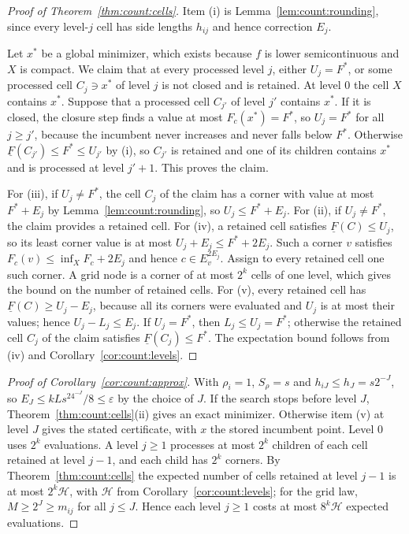 \begin{proof}[Proof of Theorem~\ref{thm:count:cells}]
Item (i) is Lemma~\ref{lem:count:rounding}, since every level-$j$ cell has
side lengths $h_{ij}$ and hence correction $E_j$.

Let $x^*$ be a global minimizer, which exists because $f$ is lower
semicontinuous and $X$ is compact. We claim that at every processed level
$j$, either $U_j=F^*$, or some processed cell $C_j\ni x^*$ of level $j$ is
not closed and is retained. At level $0$ the cell $X$ contains $x^*$. Suppose
that a processed cell $C_{j'}$ of level $j'$ contains $x^*$. If it is
closed, the closure step finds a value at most $F_c(x^*)=F^*$, so
$U_{j}=F^*$ for all $j\ge j'$, because the incumbent never increases and
never falls below $F^*$. Otherwise $\underline F(C_{j'})\le F^*\le U_{j'}$ by
(i), so $C_{j'}$ is retained and one of its children contains $x^*$ and is
processed at level $j'+1$. This proves the claim.

For (iii), if $U_j\ne F^*$, the cell $C_j$ of the claim has a corner with
value at most $F^*+E_j$ by Lemma~\ref{lem:count:rounding}, so
$U_j\le F^*+E_j$. For (ii), if $U_j\ne F^*$, the claim provides a retained
cell. For (iv), a retained cell satisfies $\underline F(C)\le U_j$, so its
least corner value is at most $U_j+E_j\le F^*+2E_j$. Such a corner $v$
satisfies $F_c(v)\le\inf_XF_c+2E_j$ and hence $c\in E_v^{2E_j}$. Assign to
every retained cell one such corner. A grid node is a corner of at most
$2^k$ cells of one level, which gives the bound on the number of retained
cells. For (v), every retained cell has $\underline F(C)\ge U_j-E_j$, because
all its corners were evaluated and $U_j$ is at most their values; hence
$U_j-L_j\le E_j$. If $U_j=F^*$, then $L_j\le U_j=F^*$; otherwise the retained
cell $C_j$ of the claim satisfies $\underline F(C_j)\le F^*$. The expectation
bound follows from (iv) and Corollary~\ref{cor:count:levels}.
\end{proof}

\begin{proof}[Proof of Corollary~\ref{cor:count:approx}]
With $\rho_i=1$, $S_\rho=s$ and $h_{iJ}\le h_J=s2^{-J}$, so
$E_J\le kLs^24^{-J}/8\le\varepsilon$ by the choice of $J$. If the search stops
before level $J$, Theorem~\ref{thm:count:cells}(ii) gives an exact minimizer.
Otherwise item (v) at level $J$ gives the stated certificate, with $x$ the
stored incumbent point. Level $0$ uses $2^k$ evaluations. A level $j\ge1$
processes at most $2^k$ children of each cell retained at level $j-1$, and
each child has $2^k$ corners. By Theorem~\ref{thm:count:cells} the expected
number of cells retained at level $j-1$ is at most $2^k\mathcal H$, with
$\mathcal H$ from Corollary~\ref{cor:count:levels}; for the grid law,
$M\ge2^J\ge m_{ij}$ for all $j\le J$. Hence each level $j\ge1$ costs at most
$8^k\mathcal H$ expected evaluations.
\end{proof}

